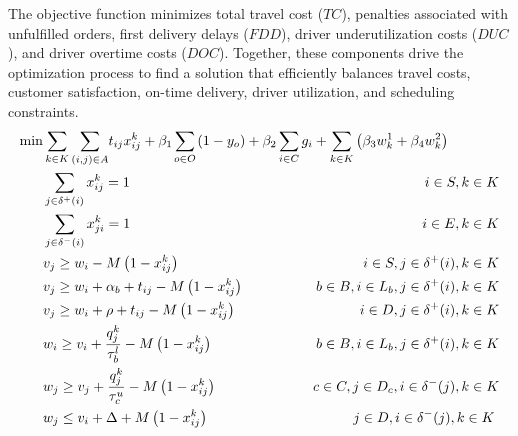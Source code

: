 \documentclass[authoryear,preprint,review,11pt]{elsarticle}
\begin{document}
The objective function minimizes total travel cost ($TC$), penalties associated with unfulfilled orders, first delivery delays ($FDD$), driver underutilization costs ($DUC$), and driver overtime costs ($DOC$). Together, these components drive the optimization process to find a solution that efficiently balances travel costs, customer satisfaction, on-time delivery, driver utilization, and scheduling constraints.
{
\small
\begin{alignat}{3}
    \label{mod:obj}   \min & \sum_{k \in K}{{ \sum_{ \substack{(i,j) \in A} }} {t_{ij}x^{k}_{ij}}} + \beta_1\smashoperator{\sum_{ o \in O}}{  \left(1-y_o\right)} \hspace{-0mm}  + \beta_2 \smashoperator{ \sum_{i \in C } } { g_i  } +  \sum_{k \in K}\left({\beta_3 w^{1}_k  + \beta_4  w^{2}_k}\right) &                             \\
    \label{mod:c1}         & \sum_{j \in \delta^{+}(i) }{x^k_{ij}} =1   & \hspace{-10mm}  i \in S, k \in K   \\
    \label{mod:c2}         & \sum_{j \in \delta^{-}(i)}{x^k_{ji}} = 1     & \hspace{-10mm} i \in E, k \in K\\
    \label{mod:c03}        & v_j \geq  w_i  - M\left(1-x^{k}_{ij}\right)   & \hspace{-30mm}  i \in S, j \in \delta^{+}(i),  k \in K      \\
    \label{mod:c3}         & v_j \geq  w_i + \alpha_{b} + t_{ij} - M\left(1-x^{k}_{ij}\right) & \hspace{-40mm} b \in B, i \in L_b, j \in \delta^{+}(i),  k \in K     \\
    \label{mod:c4}         & v_j \geq  w_i + \rho + t_{ij} - M\left(1-x^{k}_{ij}\right)                                                                       & \hspace{-40mm} i \in D  , j \in \delta^{+}(i), k \in K                         \\
    \label{mod:c5}         & w_{i} \geq v_{i}  + \frac{q^k_j}{\tau^l_b} -M\left(1- x^{k}_{ij}\right)   & \hspace{-40mm}  b \in B,  i \in L_{b},  j \in \delta^{+}(i), k \in K \\
    \label{mod:c6}         & w_{j} \geq v_{j}  + {  \frac{q^k_j}{\tau^u_c} -M\left(1- x^{k}_{ij}\right) }     & \hspace{-40mm}  c \in  C, j \in D_{c}, i \in \delta^{-}(j),  k \in K \\
    \label{mod:c7}         & w_{j} \leq v_{i}  + \Delta + M\left(1- x^{k}_{ij}\right)  & \hspace*{-50mm} j \in D,  i \in \delta^{-}(j),  k \in K \text{ }  \\

\end{alignat}}
\end{document}
